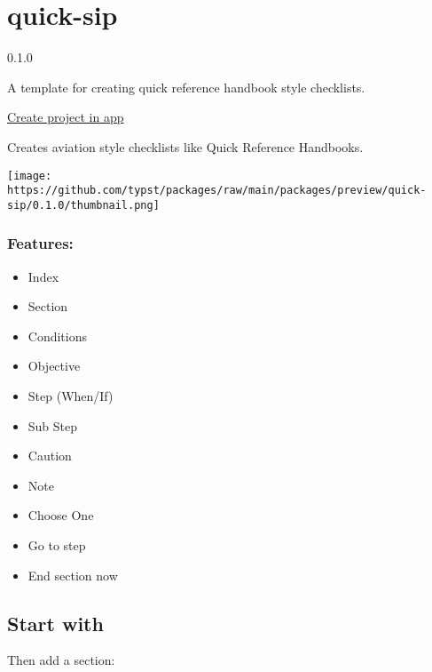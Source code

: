 \section{quick-sip}\label{quick-sip}

{ 0.1.0 }

A template for creating quick reference handbook style checklists.

\href{/app?template=quick-sip&version=0.1.0}{Create project in app}

\label{readme}
Creates aviation style checklists like Quick Reference Handbooks.

\texttt{[image: https://github.com/typst/packages/raw/main/packages/preview/quick-sip/0.1.0/thumbnail.png]}

\subsubsection{Features:}\label{features}

\begin{itemize}
\tightlist
\item
  Index
\item
  Section
\item
  Conditions
\item
  Objective
\item
  Step (When/If)
\item
  Sub Step
\item
  Caution
\item
  Note
\item
  Choose One
\item
  Go to step
\item
  End section now
\end{itemize}

\subsection{Start with}\label{start-with}

\begin{Shaded}
\begin{Highlighting}[]
\end{Highlighting}
\end{Shaded}

Then add a section:

\begin{Shaded}
\begin{Highlighting}[]
\NormalTok{\#section("Cup of Tea preparation")[}
\NormalTok{]}
\end{Highlighting}
\end{Shaded}


